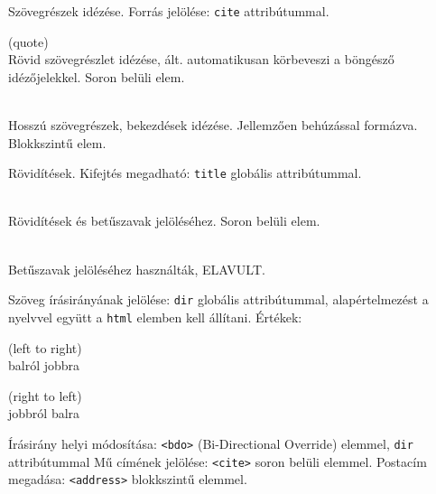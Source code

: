 \documentclass[usenames,dvipsnames,aspectratio=169]{beamer}
\newcommand{\kiemel}[1]{{\color{kiemelesszin}#1}}
\begin{document}
\begin{frame}
  Szövegrészek idézése. Forrás jelölése: \texttt{cite} attribútummal.
  \begin{description}[m]
    \item[\texttt{<q>}] (quote) \hfill \\ Rövid szövegrészlet idézése, ált. automatikusan körbeveszi a böngésző idézőjelekkel. Soron belüli elem.
    \item[\texttt{<blockquote>}] \hfill \\ Hosszú szövegrészek, bekezdések idézése. Jellemzően behúzással formázva. Blokkszintű elem.
  \end{description}
  \vfill
  Rövidítések. Kifejtés megadható: \texttt{title} globális attribútummal.
  \begin{description}[m]
    \item[\texttt{<abbr>}] \hfill \\ Rövidítések és betűszavak jelöléséhez. Soron belüli elem.
    \item[\texttt{<acronym>}] \hfill \\ Betűszavak jelöléséhez használták, \kiemel{ELAVULT}.
  \end{description}
\end{frame}

\begin{frame}
  Szöveg írásirányának jelölése: \texttt{dir} globális attribútummal, alapértelmezést a nyelvvel együtt a \texttt{html} elemben kell állítani. Értékek:
  \begin{description}[m]
    \item[\texttt{ltr}] (left to right) \hfill \\ balról jobbra
    \item[\texttt{rtl}] (right to left) \hfill \\ jobbról balra
  \end{description}
  \vfill
  Írásirány helyi módosítása: \texttt{<bdo>} (Bi-Directional Override) elemmel, \texttt{dir} attribútummal
  \vfill
  Mű címének jelölése: \texttt{<cite>} soron belüli elemmel.
  \vfill
  Postacím megadása: \texttt{<address>} blokkszintű elemmel.
\end{frame}
\end{document}
